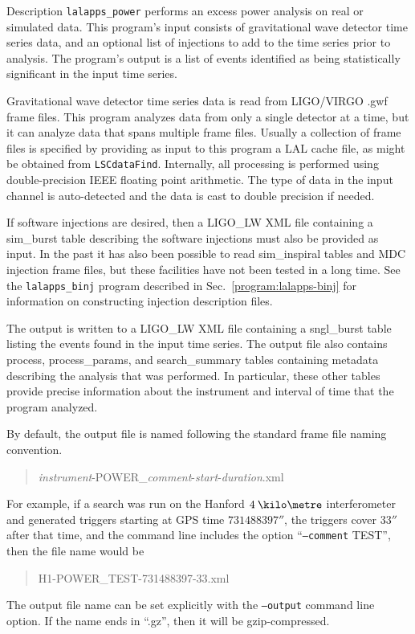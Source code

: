 \documentclass[10pt]{article}
\newcommand{\prog}[1]{\texttt{#1}}
\newcommand{\option}[1]{\texttt{#1}}
\newcommand{\parm}[1]{\textit{#1}}
\newenvironment{entry}%
{\begin{list}{}{\renewcommand{\makelabel}[1]%
{\parbox[b]{\labelwidth}{\makebox[0pt][l]{\textbf{##1}}\\}}%
\setlength{\labelwidth}{1em}%
\setlength{\labelsep}{1em}%
\setlength{\leftmargin}{2em}%
\setlength{\topsep}{\medskipamount}%
\setlength{\itemsep}{\medskipamount}%
\setlength{\parsep}{\medskipamount}%
\setlength{\listparindent}{0pt}}}
{\end{list}}
\begin{document}
\begin{entry}
\item[Description] 
\prog{lalapps\_power} performs an excess power analysis on real or
simulated data.  This program's input consists of gravitational wave
detector time series data, and an optional list of injections to add to the
time series prior to analysis.  The program's output is a list of events
identified as being statistically significant in the input time series.

Gravitational wave detector time series data is read from LIGO/VIRGO .gwf
frame files.  This program analyzes data from only a single detector at a
time, but it can analyze data that spans multiple frame files.  Usually a
collection of frame files is specified by providing as input to this
program a LAL cache file, as might be obtained from \prog{LSCdataFind}.
Internally, all processing is performed using double-precision IEEE
floating point arithmetic.  The type of data in the input channel is
auto-detected and the data is cast to double precision if needed.

If software injections are desired, then a LIGO\_LW XML file containing a
sim\_burst table describing the software injections must also be provided
as input.  In the past it has also been possible to read sim\_inspiral
tables and MDC injection frame files, but these facilities have not been
tested in a long time.  See the \prog{lalapps\_binj} program described in
Sec.~\ref{program:lalapps-binj} for information on constructing injection
description files.

The output is written to a LIGO\_LW XML file containing a sngl\_burst table
listing the events found in the input time series.  The output file also
contains process, process\_params, and search\_summary tables containing
metadata describing the analysis that was performed.  In particular, these
other tables provide precise information about the instrument and interval
of time that the program analyzed.

By default, the output file is named following the standard frame file
naming convention.
\begin{quote}
\parm{instrument}-POWER\_\parm{comment}-\parm{start}-\parm{duration}.xml
\end{quote}
For example, if a search was run on the Hanford \(\unit{4}{\kilo\metre}\)
interferometer and generated triggers starting at GPS time
\(\unit{731488397}{\second}\), the triggers cover \(\unit{33}{\second}\)
after that time, and the command line includes the option
``\option{--comment} TEST'', then the file name would be 
\begin{quote}
H1-POWER\_TEST-731488397-33.xml
\end{quote}
The output file name can be set explicitly with the \option{--output}
command line option.  If the name ends in ``.gz'', then it will be
gzip-compressed.


\end{entry}
\end{document}
